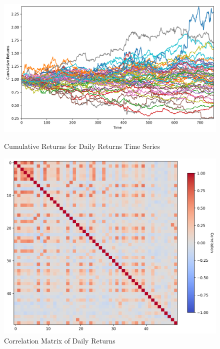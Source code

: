 \begin{figure}[H]
    \centering
    \begin{minipage}[t]{0.5789\textwidth}
        \centering
        \includegraphics[width=\textwidth]{images/cumulative_returns_qrt_timeseries_data.png}
        \captionsetup{font=tiny}
        \caption{Cumulative Returns for Daily Returns Time Series}
        \label{fig:cumulative_returns}
    \end{minipage}%
    \begin{minipage}[t]{0.4211\textwidth}
        \centering
        \includegraphics[width=\textwidth]{images/correlation_matrix_50by50_timeseries_qtr_data.png}
        \captionsetup{font=tiny}
        \caption{Correlation Matrix of Daily Returns}
        \label{fig:corr_matrix_ts_qrt_data}
    \end{minipage}
\end{figure}
